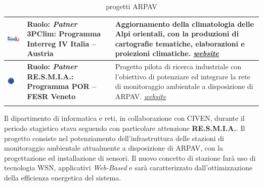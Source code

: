 \begin{longtable}{ p{} | p{} | p{}}
\midrule
\vfill \includegraphics[scale=0.7]{./capitoli/capitolo1/img/interr} & \vfill \textbf{{\color{Plum}Ruolo}: \textit{Patner}} \newline \vfill \textbf{{\color{ForestGreen}3PClim}: Programma Interreg IV Italia – Austria} &   Aggiornamento della climatologia delle Alpi orientali, con la produzioni di cartografie tematiche, elaborazioni e proiezioni climatiche. \textit{\href{http://www.interreg.net/it/programma/programma.asp}{website}}\\
\midrule
\vfill \includegraphics[scale=0.7]{./capitoli/capitolo1/img/resmia} & \vfill \textbf{{\color{Plum}Ruolo}: \textit{Patner}} \newline \vfill \textbf{{\color{ForestGreen}RE.S.M.I.A.}: Programma POR – FESR Veneto} & Progetto pilota di ricerca industriale con l’obiettivo di potenziare ed integrare la rete di monitoraggio ambientale a disposizione di ARPAV. \textit{\href{http://www.resmia.eu/}{website}} \\
\bottomrule
\caption{progetti ARPAV}
\end{longtable}

Il dipartimento di informatica e reti, in collaborazione con CIVEN, durante il periodo stagistico stava seguendo con particolare attenzione \textbf{RE.S.M.I.A.}. Il progetto consiste nel potenziamento dell'infrastruttura delle stazioni di monitoraggio ambientale attualmente a disposizione di ARPAV, con la progettazione ed installazione di sensori. Il nuovo concetto di stazione farà uso di tecnologia WSN, applicativi \textit{Web-Based} e sarà caratterizzato dall'ottimizzazione della efficienza energetica del sistema. \\


